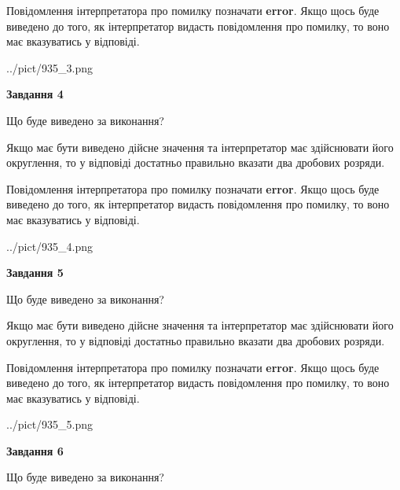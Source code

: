 \documentclass[12pt, ukrainian]{article}
\begin{document}
{\begin {Large}
Повідомлення інтерпретатора про помилку позначати \textbf{error}.
Якщо щось буде виведено до того, як інтерпретатор видасть повідомлення про помилку, 
то воно має вказуватись у відповіді. \par

\begin{center}
	{../pict/935_3.png}
\end{center}
\newpage

{\begin {center}\textbf{Завдання 4}\end {center}}\par
Що буде виведено за виконання? \par

Якщо має бути виведено дійсне значення та інтерпретатор має здійснювати його округлення, 
то у відповіді достатньо правильно вказати два дробових розряди.

Повідомлення інтерпретатора про помилку позначати \textbf{error}.
Якщо щось буде виведено до того, як інтерпретатор видасть повідомлення про помилку, 
то воно має вказуватись у відповіді. \par

\begin{center}
	{../pict/935_4.png}
\end{center}
\newpage

{\begin {center}\textbf{Завдання 5}\end {center}}\par
Що буде виведено за виконання? \par

Якщо має бути виведено дійсне значення та інтерпретатор має здійснювати його округлення, 
то у відповіді достатньо правильно вказати два дробових розряди.

Повідомлення інтерпретатора про помилку позначати \textbf{error}.
Якщо щось буде виведено до того, як інтерпретатор видасть повідомлення про помилку, 
то воно має вказуватись у відповіді. \par

\begin{center}
	{../pict/935_5.png}
\end{center}
\newpage

{\begin {center}\textbf{Завдання 6}\end {center}}\par
Що буде виведено за виконання? \par


\end{Large}}
\end{document}
